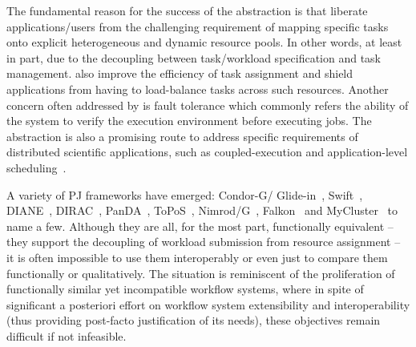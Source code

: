 \documentclass{sig-alternate}
\begin{document}
The fundamental reason for the success of the \pilotjob abstraction is that
\pilotjobs liberate applications/users from the challenging requirement of
mapping specific tasks onto explicit heterogeneous and dynamic resource pools.
In other words, at least in part, due to the decoupling between task/workload
specification and task management. \pilotjobs also improve the efficiency of
task assignment and shield applications from having to load-balance tasks
across such resources.
Another concern often addressed by \pilotjobs is fault
tolerance which commonly refers the ability of the \pilotjob system to verify
the execution environment before executing jobs. The \pilotjob abstraction is
also a promising route to address specific requirements of distributed
scientific applications, such as coupled-execution and application-level
scheduling~\cite{ko-efficient,DBLP:conf/hpdc/KimHMAJ10}.



A variety of PJ frameworks have emerged: Condor-G/
Glide-in~\cite{condor-g}, Swift~\cite{Wilde2011},
DIANE~\cite{Moscicki:908910}, DIRAC~\cite{1742-6596-219-6-062049},
PanDA~\cite{1742-6596-219-6-062041}, ToPoS~\cite{topos},
Nimrod/G~\cite{10.1109/HPC.2000.846563}, Falkon~\cite{1362680} and
MyCluster~\cite{1652061} to name a few. Although they are all, for the
most part, functionally equivalent -- they support the decoupling of
workload submission from resource assignment -- it is often impossible
to use them interoperably or even just to compare them functionally or
qualitatively.  The situation is reminiscent of the proliferation of
functionally similar yet incompatible workflow systems, where in spite
of significant a posteriori effort on workflow system extensibility
and interoperability (thus providing post-facto justification of its
needs), these objectives remain difficult if not infeasible.
\end{document}

